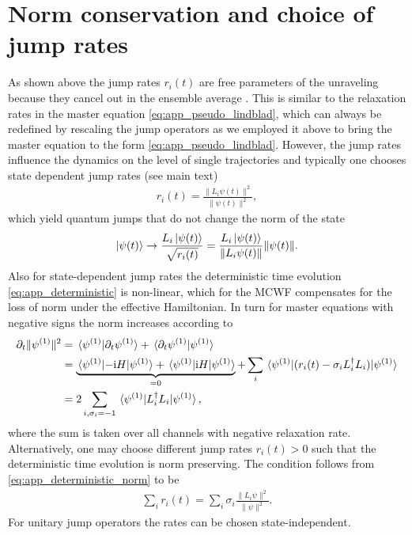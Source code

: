 \documentclass[twocolumn,prl,superscriptaddress]{revtex4-2}
\renewcommand{\i}{\mathrm i}
\begin{document}
\section{Norm conservation and choice of jump rates}
As shown above the jump rates $r_i(t)$ are free parameters of the unraveling because they cancel out in the ensemble average \cite{IKondovMschreiber2003}.  This is similar to the relaxation rates in the master equation \cref{eq:app_pseudo_lindblad}, which can always be redefined by rescaling the jump operators as we employed it above to bring the master equation to the form \cref{eq:app_pseudo_lindblad}. However, the jump rates influence the dynamics on the level of single trajectories and typically one chooses state dependent jump rates (see main text)
\begin{align}
	r_i(t) = \frac{\lVert L_i\psi (t) \rVert^2}{\lVert\psi(t)\rVert^2},
\end{align} 
which yield quantum jumps that do not change the norm of the state
\begin{align}
	\ket{\psi(t) } \rightarrow \frac{L_i \ket{\psi(t)}}{\sqrt{r_i(t)}} = \frac{L_i \ket{\psi(t)}}{\lVert L_i\psi (t) \rVert} \lVert \psi (t) \rVert.
\end{align} 
Also for state-dependent jump rates the deterministic time evolution \cref{eq:app_deterministic} is non-linear, which for the MCWF compensates for the loss of norm under the effective Hamiltonian. In turn for master equations with negative signs the norm increases according to
\begin{align}
	\begin{split}
		\partial_t \lVert \psi^{(1)} \rVert^2 &= \ip*{\psi^{(1)}}{\partial_t \psi^{(1)}} + \ip*{\partial_t \psi^{(1)}}{\psi^{(1)}} \\ &= \underbrace{\matrixel*{\psi^{(1)}}{-\i H}{\psi^{(1)}} + \matrixel*{\psi^{(1)}}{\i H}{\psi^{(1)}}}_{=0}+ \sum_{i} \matrixel*{\psi^{(1)}}{( r_i(t) - \sigma_i L_i^\dagger L_i)}{\psi^{(1)}} \\
		&= 2 \sum_{i, \sigma_i=-1} \matrixel*{\psi^{(1)}}{L_i^\dagger L_i }{\psi^{(1)}},
	\end{split}
	\label{eq:app_deterministic_norm}
\end{align}
where the sum is taken over all channels with negative relaxation rate. 
Alternatively, one may choose different jump rates $r_i(t)>0$ such that the deterministic time evolution is norm preserving. The condition follows from \cref{eq:app_deterministic_norm} to be
\begin{align} 
	\sum_i r_i(t) = \sum_i \sigma_i \frac{\lVert L_i \psi \rVert^2 }{ \lVert \psi \rVert^2}. 
\end{align}	
For unitary jump operators the rates can be chosen state-independent. 
\end{document}
